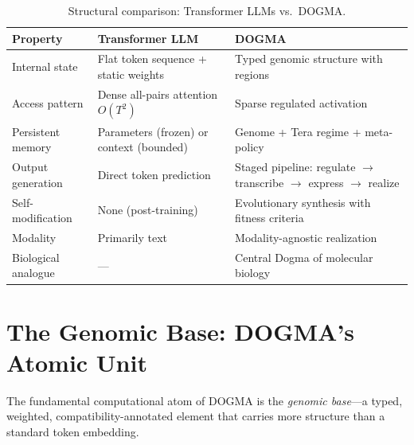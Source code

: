 \begin{table}[H]
\centering
\caption{Structural comparison: Transformer LLMs vs.\ DOGMA.}
\label{tab:dogma-vs-transformer}
\begin{tabularx}{\textwidth}{L{3cm} L{4cm} Y}
\toprule
\textbf{Property} & \textbf{Transformer LLM} & \textbf{DOGMA} \\
\midrule
Internal state & Flat token sequence + static weights & Typed genomic structure with regions \\
Access pattern & Dense all-pairs attention $O(T^2)$ & Sparse regulated activation \\
Persistent memory & Parameters (frozen) or context (bounded) & Genome + Tera regime + meta-policy \\
Output generation & Direct token prediction & Staged pipeline: regulate $\to$ transcribe $\to$ express $\to$ realize \\
Self-modification & None (post-training) & Evolutionary synthesis with fitness criteria \\
Modality & Primarily text & Modality-agnostic realization \\
Biological analogue & --- & Central Dogma of molecular biology \\
\bottomrule
\end{tabularx}
\end{table}

\section{The Genomic Base: DOGMA's Atomic Unit}
\label{sec:genomic-base}

The fundamental computational atom of DOGMA is the \emph{genomic base}---a typed, weighted, compatibility-annotated element that carries more structure than a standard token embedding.

